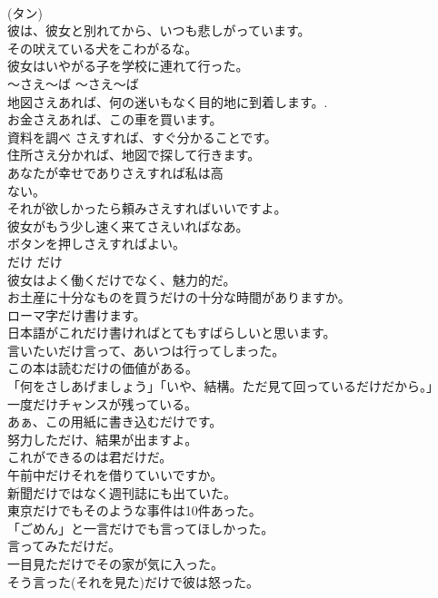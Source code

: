 \documentclass[8pt]{extreport}
\begin{document}
\begin{CJK}{UTF8}{min}
\\	(タン)
\\	彼は、彼女と別れてから、いつも悲しがっています。  
\\	その吠えている犬をこわがるな。  
\\	彼女はいやがる子を学校に連れて行った。  
\\	〜さえ〜ば	〜さえ〜ば	
\\	地図さえあれば、何の迷いもなく目的地に到着します。.   
\\	お金さえあれば、この車を買います。  
\\	資料を調べ さえすれば、すぐ分かることです。  
\\	住所さえ分かれば、地図で探して行きます。  
\\	あなたが幸せでありさえすれば私は高
\\	ない。   
\\	それが欲しかったら頼みさえすればいいですよ。   
\\	彼女がもう少し速く来てさえいればなあ。   
\\	ボタンを押しさえすればよい。   
\\	だけ	だけ	
\\	彼女はよく働くだけでなく、魅力的だ。   
\\	お土産に十分なものを買うだけの十分な時間がありますか。  
\\	ローマ字だけ書けます。  
\\	日本語がこれだけ書ければとてもすばらしいと思います。  
\\	言いたいだけ言って、あいつは行ってしまった。  
\\	この本は読むだけの価値がある。  
\\	「何をさしあげましょう」「いや、結構。ただ見て回っているだけだから。」  
\\	一度だけチャンスが残っている。  
\\	あぁ、この用紙に書き込むだけです。  
\\	努力しただけ、結果が出ますよ。  
\\	これができるのは君だけだ。  
\\	午前中だけそれを借りていいですか。  
\\	新聞だけではなく週刊誌にも出ていた。  
\\	東京だけでもそのような事件は10件あった。  
\\	「ごめん」と一言だけでも言ってほしかった。  
\\	言ってみただけだ。  
\\	一目見ただけでその家が気に入った。  
\\	そう言った(それを見た)だけで彼は怒った。  

\end{CJK}
\end{document}
